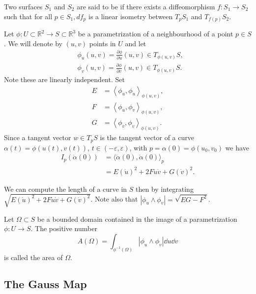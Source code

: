\documentclass[10pt]{article}
\begin{document}
\begin{definition}
    Two surfaces $S_1$ and $S_2$ are said to be  if there exists a diffeomorphism $f: S_1 \rightarrow S_2$ such that for all $p \in S_1, d f_p$ is a linear isometry between $T_p S_1$ and $T_{f(p)} S_2$.
\end{definition}



Let $\phi: U \subset \mathbb{R}^2 \rightarrow S \subset \mathbb{R}^3$ be a parametrization of a neighbourhood of a point $p \in S$. We will denote by $(u, v)$ points in $U$ and let
$$
\begin{aligned}
& \phi_u(u, v)=\frac{\partial \phi}{\partial u}(u, v) \in T_{\phi(u, v)} S, \\
& \phi_v(u, v)=\frac{\partial \phi}{\partial v}(u, v) \in T_{\phi(u, v)} S .
\end{aligned}
$$
Note these are linearly independent. Set
$$
\begin{aligned}
E&=\left\langle\phi_u, \phi_u\right\rangle_{\phi(u, v)}, \\
F&=\left\langle\phi_u, \phi_v\right\rangle_{\phi(u, v)}, \\
G&=\left\langle\phi_v, \phi_v\right\rangle_{\phi(u, v)} .
\end{aligned}
$$
Since a tangent vector $w \in T_p S$ is the tangent vector of a curve $\alpha(t)=\phi(u(t), v(t))$, $t \in(-\varepsilon, \varepsilon)$, with $p=\alpha(0)=\phi\left(u_0, v_0\right)$ we have
$$
\begin{aligned}
I_p(\dot{\alpha}(0)) & =\langle\dot{\alpha}(0), \dot{\alpha}(0)\rangle_p \\
& =E(\dot{u})^2+2 F \dot{u} \dot{v}+G(\dot{v})^2 .
\end{aligned}
$$

We can compute the length of a curve in $S$ then by integrating $\sqrt{E(\dot{u})^2+2 F \dot{u} \dot{v}+G(\dot{v})^2}$.
Note also that $|\phi_u \wedge \phi_v| = \sqrt{EG - F^2}$.


\begin{definition}[Area]
    Let $\Omega \subset S$ be a bounded domain contained in the image of a parametrization $\phi: U \rightarrow S$. The positive number
    $$
    A(\Omega)=\int_{\phi^{-1}(\Omega)}\left|\phi_u \wedge \phi_v\right| \dd u \dd v
    $$
    is called the area of $\Omega$.
\end{definition}

\subsection{The Gauss Map}
\end{document}
